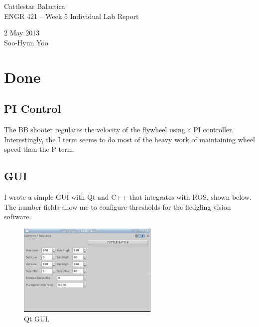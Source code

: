\documentclass[12pt,letterpaper]{article}
\begin{document}
\begin{titlepage}
	\vspace*{4cm}
	\begin{flushright}
	{\huge
		Cattlestar Balactica \\ [1cm]
	}
	{\large
		ENGR 421 -- Week 5 Individual Lab Report \\ [3cm]
	}
	\end{flushright}

	\begin{flushright}
	2 May 2013 \\
	Soo-Hyun Yoo
	\end{flushright}

\end{titlepage}

\newpage

\section*{Done}

\subsection*{PI Control}

The BB shooter regulates the velocity of the flywheel using a PI controller.
Interestingly, the I term seems to do most of the heavy work of maintaining
wheel speed than the P term.

\subsection*{GUI}

I wrote a simple GUI with Qt and C++ that integrates with ROS, shown below. The
number fields allow me to configure thresholds for the fledgling vision
software.

\begin{figure}[!h]
	\centering
	\includegraphics[width=0.6\textwidth]{gui.png}
	\caption{Qt GUI.}
	\label{fig:gui}
\end{figure}
\end{document}
